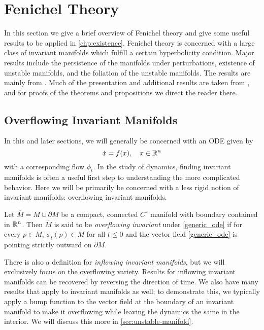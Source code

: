 \chapter{Fenichel Theory}\label{condition-verification}

In this section we give a brief overview of Fenichel theory and give some useful results to be applied in \cref{chp:existence}. Fenichel theory is concerned with a large class of invariant manifolds which fulfill a certain hyperbolicity condition. Major results include the persistence of the manifolds under perturbations, existence of unstable manifolds, and the foliation of the unstable manifolds. The results are mainly from \cite{fenichel1971persistence,fenichel1974asymptotic}. Much of the presentation and additional results are taken from \cite{wiggins1994normally}, and for proofs of the theorems and propositions we direct the reader there.

\section{Overflowing Invariant Manifolds}
In this and later sections, we will generally be concerned with an ODE given by
\begin{equation}\label{generic_ode}
	\dot x = f(x), \quad x \in \mathbb{R}^n
\end{equation}
with a corresponding flow \(\phi_t\). In the study of dynamics, finding invariant manifolds is often a useful first step to understanding the more complicated behavior. Here we will be primarily be concerned with a less rigid notion of invariant manifolds: overflowing invariant manifolds.
\begin{defn}
	Let \(\overline M = M \cup \partial M\) be a compact, connected \(C^r\) manifold with boundary contained in \(\mathbb{R}^n\). Then \(\overline M\) is said to be \emph{overflowing invariant} under \cref{generic_ode} if for every \(p \in \overline M\), \(\phi_t(p) \in \overline M\) for all \(t\leq 0\) and the vector field \cref{generic_ode} is pointing strictly outward on \(\partial M\).
\end{defn}
There is also a definition for \emph{inflowing invariant manifolds}, but we will exclusively focus on the overflowing variety. Results for inflowing invariant manifolds can be recovered by reversing the direction of time. We also have many results that apply to invariant manifolds as well; to demonstrate this, we typically apply a bump function to the vector field at the boundary of an invariant manifold to make it overflowing while leaving the dynamics the same in the interior. We will discuss this more in \cref{sec:unstable-manifold}.

